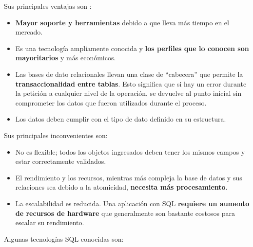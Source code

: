 Sus principales ventajas son \cite{ref8} :

\begin{itemize}
\item \textbf{Mayor soporte y herramientas} debido a que lleva más tiempo en el mercado.

\item Es una tecnología ampliamente conocida y \textbf{los perfiles que lo conocen son mayoritarios} y más económicos.

\item Las bases de dato relacionales llevan una clase de “cabecera” que permite la \textbf{transaccionalidad entre tablas}. Esto significa que si hay un error durante la petición a cualquier nivel de la operación, se devuelve al punto inicial sin comprometer los datos que fueron utilizados durante el proceso.

\item Los datos deben cumplir con el tipo de dato definido en su estructura.
\end{itemize}

Sus principales inconvenientes son: 

\begin{itemize}
\item No es flexible; todos los objetos ingresados deben tener los mismos campos y estar correctamente validados.

\item El rendimiento y los recursos, mientras más compleja la base de datos y sus relaciones sea debido a la atomicidad, \textbf{necesita más procesamiento}.

\item La escalabilidad es reducida. Una aplicación con SQL \textbf{requiere un aumento de recursos de hardware} que generalmente son bastante costosos para escalar su rendimiento.
\end{itemize}

Algunas tecnologías SQL conocidas son:


